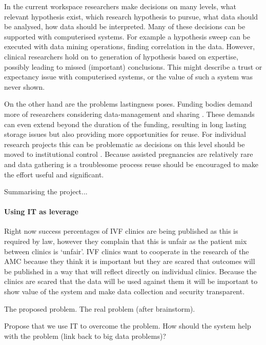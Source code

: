 In the current workspace researchers make decisions on many levels, \eg{} what relevant hypothesis exist, which research hypothesis to pursue, what data should be analysed, how data should be interpreted.
Many of these decisions can be supported with computerised systems.
For example a hypothesis sweep can be executed with data mining operations, finding correlation in the data.
However, clinical researchers hold on to generation of hypothesis based on expertise, possibly leading to missed (important) conclusions.
This might describe a trust or expectancy issue with computerised systems, or the value of such a system was never shown.

On the other hand are the problems lastingness poses.
Funding bodies demand more of researchers considering data-management and sharing \cite{dsb3lynch}.
These demands can even extend beyond the duration of the funding, resulting in long lasting storage issues but also providing more opportunities for reuse.
For individual research projects this can be problematic as decisions on this level should be moved to institutional control \cite{dsb3lynch}.
Because assisted pregnancies are relatively rare and data gathering is a troublesome process reuse should be encouraged to make the effort useful and significant.

Summarising the project...

\paragraph{Using IT as leverage}
Right now success percentages of IVF clinics are being published as this is required by law, however they complain that this is unfair as the patient mix between clinics is ‘unfair’. 
IVF clinics want to cooperate in the research of the AMC because they think it is important but they are scared that outcomes will be published in a way that will reflect directly on individual clinics.
Because the clinics are scared that the data will be used against them it will be important to show value of the system and make data collection and security transparent.

The proposed problem.
The real problem (after brainstorm).

Propose that we use IT to overcome the problem.
How should the system help with the problem (link back to big data problems)?

